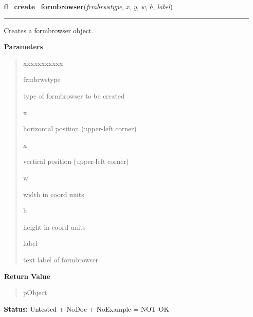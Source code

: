     \label{xformslib:library:fl_create_formbrowser}

    \vspace{0.5ex}

\hspace{.8\funcindent}\begin{boxedminipage}{\funcwidth}

    \raggedright \textbf{fl\_create\_formbrowser}(\textit{frmbrwstype}, \textit{x}, \textit{y}, \textit{w}, \textit{h}, \textit{label})

    \vspace{-1.5ex}

    \rule{\textwidth}{0.5\fboxrule}
\setlength{\parskip}{2ex}
    Creates a formbrowser object.

\setlength{\parskip}{1ex}
      \textbf{Parameters}
      \vspace{-1ex}

      \begin{quote}
        \begin{Ventry}{xxxxxxxxxxx}

          \item[frmbrwstype]

          type of formbrowser to be created

          \item[x]

          horizontal position (upper-left corner)

          \item[x]

          vertical position (upper-left corner)

          \item[w]

          width in coord units

          \item[h]

          height in coord units

          \item[label]

          text label of formbrowser

        \end{Ventry}

      \end{quote}

      \textbf{Return Value}
    \vspace{-1ex}

      \begin{quote}
      pObject

      \end{quote}

\textbf{Status:} Untested + NoDoc + NoExample = NOT OK



    \end{boxedminipage}

